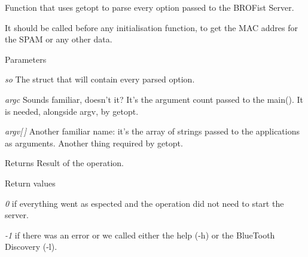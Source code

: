 Function that uses getopt to parse every option passed to the BROFist Server. 

It should be called before any initialisation function, to get the MAC addres for the SPAM or any other data. 
\begin{DoxyParams}{Parameters}
\item[{\em so}]The struct that will contain every parsed option. \item[{\em argc}]Sounds familiar, doesn't it? It's the argument count passed to the main(). It is needed, alongside argv, by getopt. \item[{\em argv\mbox{[}$\,$\mbox{]}}]Another familiar name: it's the array of strings passed to the applications as arguments. Another thing required by getopt. \end{DoxyParams}
\begin{DoxyReturn}{Returns}
Result of the operation. 
\end{DoxyReturn}

\begin{DoxyRetVals}{Return values}
\item[{\em 0}]if everything went as espected and the operation did not need to start the server. \item[{\em -\/1}]if there was an error or we called either the help ({\ttfamily -\/h}) or the BlueTooth Discovery ({\ttfamily -\/l}). \end{DoxyRetVals}
